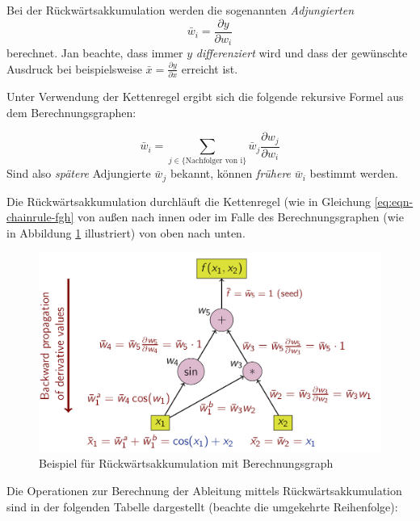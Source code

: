 \documentclass[
]{book}
\theoremstyle{definition}
\theoremstyle{definition}
\theoremstyle{definition}
\theoremstyle{definition}
\theoremstyle{remark}
\begin{document}
Bei der Rückwärtsakkumulation werden die sogenannten \emph{Adjungierten}
\begin{equation*}
\bar{w}_i = \frac{\partial y}{\partial w_i}
\end{equation*}
berechnet. Jan beachte, dass immer \(y\) \emph{differenziert} wird und dass der
gewünschte Ausdruck bei beispielsweise \(\bar x = \frac{\partial y}{\partial x}\) erreicht ist.

Unter Verwendung der Kettenregel ergibt sich die folgende rekursive Formel aus dem
Berechnungsgraphen:

\[\bar{w}_i = \sum_{j \in \{\text{Nachfolger von i}\}} \bar{w}_j \frac{\partial w_j}{\partial w_i}\]
Sind also \emph{spätere} Adjungierte \(\bar w_j\) bekannt, können
\emph{frühere} \(\bar w_i\) bestimmt werden.

Die Rückwärtsakkumulation durchläuft die Kettenregel (wie in Gleichung
\eqref{eq:eqn-chainrule-fgh} von außen nach
innen oder im Falle des Berechnungsgraphen (wie in Abbildung \ref{fig:fig-10-ad-bw} illustriert) von oben nach unten.

\begin{figure}
\includegraphics[width=1\linewidth]{bilder/ReverseaccumulationAD} \caption{Beispiel für Rückwärtsakkumulation mit Berechnungsgraph}\label{fig:fig-10-ad-bw}
\end{figure}

Die Operationen zur Berechnung der Ableitung mittels Rückwärtsakkumulation sind in der folgenden Tabelle dargestellt (beachte die umgekehrte Reihenfolge):
\end{document}
